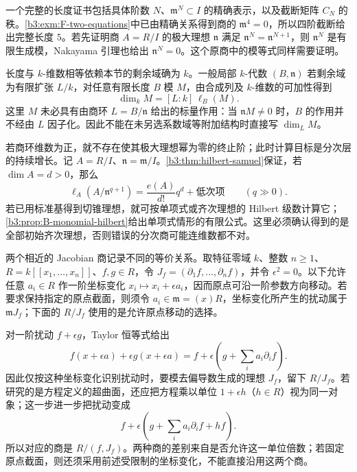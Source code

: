 一个完整的长度证书包括具体阶数 \(N\)、\(\mathfrak m^N\subset I\) 的精确表示，以及截断矩阵 \(C_N\) 的秩。\cref{b3:exm:F-two-equations}中已由精确关系得到商的 \(\mathfrak m^4=0\)，所以四阶截断给出完整长度 \(5\)。若先证明商 \(A=R/I\) 的极大理想 \(\mathfrak n\) 满足 \(\mathfrak n^N=\mathfrak n^{N+1}\)，则 \(\mathfrak n^N\) 是有限生成模，Nakayama 引理也给出 \(\mathfrak n^N=0\)。这个原商中的模等式同样需要证明。

\ProseParagraphBreak
长度与 \(k\)-维数相等依赖本节的剩余域确为 \(k\)。一般局部 \(k\)-代数 \((B,\mathfrak n)\) 若剩余域为有限扩张 \(L/k\)，对任意有限长度 \(B\) 模 \(M\)，由合成列及 \(k\)-维数的可加性得到
\[
	\dim_k M=[L:k]\,\ell_B(M).
\]
这里 \(M\) 未必具有由商环 \(L=B/\mathfrak n\) 给出的标量作用：当 \(\mathfrak n M\ne0\) 时，\(B\) 的作用并不经由 \(L\) 因子化。因此不能在未另选系数域等附加结构时直接写 \(\dim_L M\)。

\ProseParagraphBreak
若商环维数为正，就不存在使其极大理想幂为零的终止阶；此时计算目标是分次层的持续增长。记 \(A=R/I\)、\(\mathfrak n=\mathfrak m/I\)。\cref{b3:thm:hilbert-samuel}保证，若 \(\dim A=d>0\)，那么
\[
	\ell_A(A/\mathfrak n^{q+1}) =\frac{e(A)}{d!}q^d+\text{低次项}\qquad(q\gg0).
\]
若已用标准基得到切锥理想，就可按单项式或齐次理想的 Hilbert 级数计算它；\cref{b3:prop:B-monomial-hilbert}给出单项式情形的有限公式。这里必须确认得到的是全部初始齐次理想，否则错误的分次商可能连维数都不对。

\ProseParagraphBreak
两个相近的 Jacobian 商记录不同的等价关系。取特征零域 \(k\)、整数 \(n\ge1\)、\(R=k[\![x_1,\ldots,x_n]\!]\)、\(f,g\in R\)，令 \(J_f=(\partial_1f,\ldots,\partial_nf)\)，并令 \(\epsilon^2=0\)。以下允许任意 \(a_i\in R\) 作一阶坐标变化 \(x_i\mapsto x_i+\epsilon a_i\)，因而原点可沿一阶参数方向移动。若要求保持指定的原点截面，则须令 \(a_i\in\mathfrak m=(x)R\)，坐标变化所产生的扰动属于 \(\mathfrak m J_f\)；下面的 \(R/J_f\) 使用的是允许原点移动的选择。

\ProseParagraphBreak
对一阶扰动 \(f+\epsilon g\)，Taylor 恒等式给出
\[
	f(x+\epsilon a)+\epsilon g(x+\epsilon a) =f+\epsilon\left(g+\sum_i a_i\partial_i f\right).
\]
因此仅按这种坐标变化识别扰动时，要模去偏导数生成的理想 \(J_f\)，留下 \(R/J_f\)。若研究的是方程定义的超曲面，还应把方程乘以单位 \(1+\epsilon h\)（\(h\in R\)）视为同一对象；这一步进一步把扰动变成
\[
	f+\epsilon\left(g+\sum_i a_i\partial_i f+hf\right).
\]
所以对应的商是 \(R/(f,J_f)\)。两种商的差别来自是否允许这一单位倍数；若固定原点截面，则还须采用前述受限制的坐标变化，不能直接沿用这两个商。

